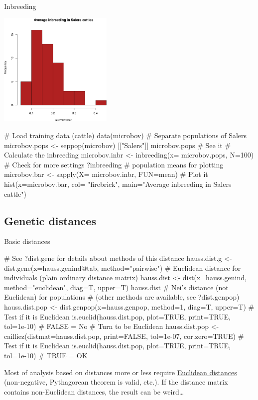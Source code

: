 \documentclass[compress, ucs, xelatex, 11pt, xcolor=svgnames,
  hyperref={
    bookmarks=true,
    unicode=true,
    colorlinks=true,
    pdftitle={Molecular data in R},
    plainpages=false,
    pdfauthor={Vojtech Zeisek},
    pdfsubject={Course about phylogeny and evolution in R},
    pdfcreator={XeLaTeX},
    pdfkeywords={R, evolution, phylogeny, molecular data},
    linkcolor=Tomato,
    anchorcolor=SaddleBrown,
    citecolor=Goldenrod,
    filecolor=DarkMagenta,
    menucolor=Sienna,
    urlcolor=DarkTurquoise,
    pdftex},
  url={hyphens, lowtilde} %
  ]{beamer}
\begin{document}
\begin{frame}[fragile]{Inbreeding}
\begin{multicols}{2}
  \includegraphics[height=5.5cm]{inbreeding.png}
  \begin{spluscode}
    # Load training data (cattle)
    data(microbov)
    # Separate populations of Salers
    microbov.pops <- seppop(microbov)
      [["Salers"]]
    microbov.pops # See it
    # Calculate the inbreeding
    microbov.inbr <- inbreeding(x=
      microbov.pops, N=100)
    # Check for more settings
    ?inbreeding
    # population means for plotting
    microbov.bar <- sapply(X=
      microbov.inbr, FUN=mean)
    # Plot it
    hist(x=microbov.bar, col=
      "firebrick", main="Average
      inbreeding in Salers cattle")
  \end{spluscode}
\end{multicols}

\end{frame}

\subsection{Genetic distances}

\begin{frame}[fragile]{Basic distances}
  \label{distances}
  \begin{spluscode}
    # See ?dist.gene for details about methods of this distance
    hauss.dist.g <- dist.gene(x=hauss.genind@tab, method="pairwise")
    # Euclidean distance for individuals (plain ordinary distance matrix)
    hauss.dist <- dist(x=hauss.genind, method="euclidean", diag=T, upper=T)
    hauss.dist
    # Nei's distance (not Euclidean) for populations
    # (other methods are available, see ?dist.genpop)
    hauss.dist.pop <- dist.genpop(x=hauss.genpop, method=1, diag=T, upper=T)
    # Test if it is Euclidean
    is.euclid(hauss.dist.pop, plot=TRUE, print=TRUE, tol=1e-10) # FALSE = No
    # Turn to be Euclidean
    hauss.dist.pop <- cailliez(distmat=hauss.dist.pop, print=FALSE,
      tol=1e-07, cor.zero=TRUE)
    # Test if it is Euclidean
    is.euclid(hauss.dist.pop, plot=TRUE, print=TRUE, tol=1e-10) # TRUE = OK
  \end{spluscode}
  \vfil
  Most of analysis based on distances more or less require \href{https://en.wikipedia.org/wiki/Euclidean_distance_matrix}{Euclidean distances} (non-negative, Pythagorean theorem is valid, etc.). If the distance matrix contains non-Euclidean distances, the result can be weird\ldots
  \vfill
\end{frame}
\end{document}
